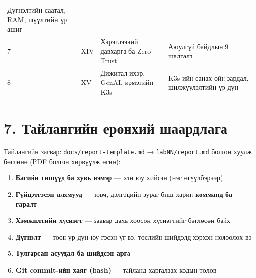 \begin{longtable}[]{@{}llll@{}}
\begin{minipage}[t]{0.22\columnwidth}
Дүгнэлтийн саатал, RAM, шүүлтийн үр ашиг\strut
\end{minipage}\tabularnewline
\begin{minipage}[t]{0.22\columnwidth}\raggedright
7\strut
\end{minipage} & \begin{minipage}[t]{0.22\columnwidth}\raggedright
XIV\strut
\end{minipage} & \begin{minipage}[t]{0.22\columnwidth}\raggedright
Хэрэглээний давхарга ба Zero Trust\strut
\end{minipage} & \begin{minipage}[t]{0.22\columnwidth}\raggedright
Аюулгүй байдлын 9 шалгалт\strut
\end{minipage}\tabularnewline
\begin{minipage}[t]{0.22\columnwidth}\raggedright
8\strut
\end{minipage} & \begin{minipage}[t]{0.22\columnwidth}\raggedright
XV\strut
\end{minipage} & \begin{minipage}[t]{0.22\columnwidth}\raggedright
Дижитал ихэр, GenAI, ирмэгийн K3s\strut
\end{minipage} & \begin{minipage}[t]{0.22\columnwidth}\raggedright
K3s-ийн санах ойн зардал, шилжүүлэлтийн үр дүн\strut
\end{minipage}\tabularnewline
\bottomrule
\end{longtable}\endgroup

\hypertarget{ux442ux430ux439ux43bux430ux43dux433ux438ux439ux43d-ux435ux440ux4e9ux43dux445ux438ux439-ux448ux430ux430ux440ux434ux43bux430ux433ux430}{%
\section{7. Тайлангийн ерөнхий шаардлага}\label{ux442ux430ux439ux43bux430ux43dux433ux438ux439ux43d-ux435ux440ux4e9ux43dux445ux438ux439-ux448ux430ux430ux440ux434ux43bux430ux433ux430}}

Тайлангийн загвар: \texttt{docs/\allowbreak{}report-template.\allowbreak{}md} → \texttt{labNN/report.md} болгон хуулж бөглөнө (PDF болгон хөрвүүлж өгнө):

\begin{enumerate}
\def\labelenumi{\arabic{enumi}.}
\tightlist
\item
  \textbf{Багийн гишүүд ба хувь нэмэр} --- хэн юу хийсэн (нэг өгүүлбэрээр)
\item
  \textbf{Гүйцэтгэсэн алхмууд} --- товч, дэлгэцийн зураг биш харин \textbf{комманд ба гаралт}
\item
  \textbf{Хэмжилтийн хүснэгт} --- заавар дахь хоосон хүснэгтийг бөглөсөн байх
\item
  \textbf{Дүгнэлт} --- тоон үр дүн юу гэсэн үг вэ, төслийн шийдэлд хэрхэн нөлөөлөх вэ
\item
  \textbf{Тулгарсан асуудал ба шийдсэн арга}
\item
  \textbf{Git commit-ийн хаяг (hash)} --- тайланд харгалзах кодын төлөв
\end{enumerate}

